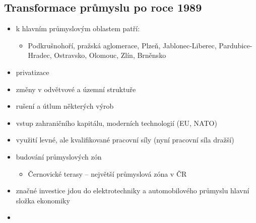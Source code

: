 \subsection{Transformace průmyslu po roce 1989}
\begin{itemize}

\item k hlavním průmyslovým oblastem patří: 
	\begin{itemize}
	\item Podkrušnohoří, pražská aglomerace, Plzeň, Jablonec-Liberec, Pardubice-Hradec, Ostravsko, Olomouc, Zlín, Brněnsko
	\end{itemize}
\item privatizace
\item změny v odvětvové a územní struktuře
\item rušení a útlum některých výrob
\item vstup zahraničního kapitálu, moderních technologií (EU, NATO)
\item využití levné, ale kvalifikované pracovní síly (nyní pracovní síla dražší)
\item budování průmyslových zón 
	\begin{itemize}
	\item Černovické terasy -- největší průmyslová zóna v ČR
	\end{itemize}
\item značné investice jdou do elektrotechniky a automobilového průmyslu \ra hlavní složka ekonomiky
\item 
\end{itemize}

